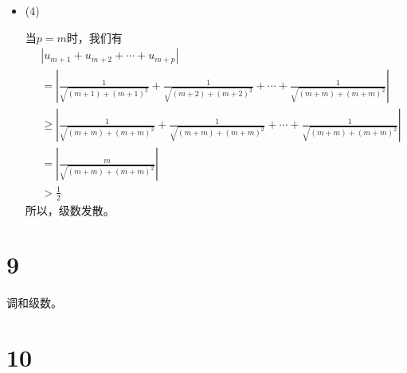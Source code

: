 \documentclass{article}
\begin{document}
\begin{itemize}
        我们有
        \begin{align*}
          |u_{m + 1} + u_{m + 2} + \cdots + u_{m + p}|
           & = \left|\frac{(-1)^{m + 1}}{m+1} + \frac{(-1)^{m + 2}}{m+2} + \cdots + \frac{(-1)^{m + p}}{m+p}\right|              \\
           & = \left|(-1)^{m + 1} (\frac{1}{m + 1} - \frac{1}{m + 2} + \cdots + \frac{(-1)^{p-1}}{m + p})\right|                 \\
           & = \left|\frac{1}{m + 1} - \frac{1}{m + 2} + \cdots + \frac{(-1)^{p-1}}{m + p}\right|                                \\
           & = \left|\frac{1}{m + 1} - \left(\frac{1}{m + 2} - \frac{1}{m + 3} + \cdots + \frac{(-1)^{p-2}}{m + p}\right)\right|
        \end{align*}
        因为
        \begin{align*}
           & \frac{1}{m + 2} - \frac{1}{m + 3} + \cdots + \frac{(-1)^{p-2}}{m + p}                                           \\
           & = (\frac{1}{m + 2} - \frac{1}{m + 3}) + (\frac{1}{m + 4} - \frac{1}{m + 5}) + \cdots + \frac{(-1)^{p-2}}{m + p} \\
           & > 0
        \end{align*}
        所以
        \begin{align*}
          \left|\frac{1}{m + 1} - \left(\frac{1}{m + 2} - \frac{1}{m + 3} + \cdots + \frac{(-1)^{p-2}}{m + p}\right)\right|
          < \frac{1}{m + 1}
        \end{align*}
        于是对任意$\epsilon > 0$，取$N = \frac{1}{\epsilon} - 1$，当$m > N$时，我们有$\frac{1}{m + 1} < \epsilon$。

  \item (4)

        当$p = m$时，我们有
        \begin{align*}
           & |u_{m + 1} + u_{m + 2} + \cdots + u_{m + p}|                                                                                                    \\
           & = \left| \frac{1}{\sqrt{(m + 1) + (m + 1)^2}} + \frac{1}{\sqrt{(m + 2) + (m + 2)^2}} + \cdots + \frac{1}{\sqrt{(m + m) + (m + m)^2}} \right|    \\
           & \geq \left| \frac{1}{\sqrt{(m + m) + (m + m)^2}} + \frac{1}{\sqrt{(m + m) + (m + m)^2}} + \cdots + \frac{1}{\sqrt{(m + m) + (m + m)^2}} \right| \\
           & = \left| \frac{m}{\sqrt{(m + m) + (m + m)^2}} \right|                                                                                           \\
           & > \frac{1}{2}
        \end{align*}
        所以，级数发散。
\end{itemize}

\section*{9}

调和级数。

\section*{10}
\end{document}
